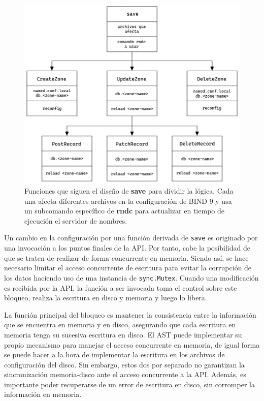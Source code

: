 \begin{figure}[!ht]
    \centering
    \includegraphics[width=\linewidth]{draws/split-save.png}
    \caption{Funciones que siguen el diseño de \textbf{save} para dividir la lógica. Cada una afecta diferentes archivos en la configuración de BIND 9 y usa un subcomando específico de \textbf{rndc} para actualizar en tiempo de ejecución el servidor de nombres.}
    \label{fig:split-save}
\end{figure}

Un cambio en la configuración por una función derivada de \verb|save| es originado por una invocación a los puntos finales de la API. Por tanto, cabe la posibilidad de que se traten de realizar de forma concurrente en memoria. Siendo así, se hace necesario limitar el acceso concurrente de escritura para evitar la corrupción de los datos haciendo uso de una instancia de \verb|sync.Mutex|. Cuando una modificación es recibida por la API, la función a ser invocada toma el control sobre este bloqueo, realiza la escritura en disco y memoria y luego lo libera.

La función principal del bloqueo es mantener la consistencia entre la información que se encuentra en memoria y en disco, asegurando que cada escritura en memoria tenga su sucesiva escritura en disco. El AST puede implementar su propio mecanismo para manejar el acceso concurrente en memoria, de igual forma se puede hacer a la hora de implementar la escritura en los archivos de configuración del disco. Sin embargo, estos dos por separado no garantizan la sincronización memoria-disco ante el acceso concurrente a la API. Además, es importante poder recuperarse de un error de escritura en disco, sin corromper la información en memoria.


